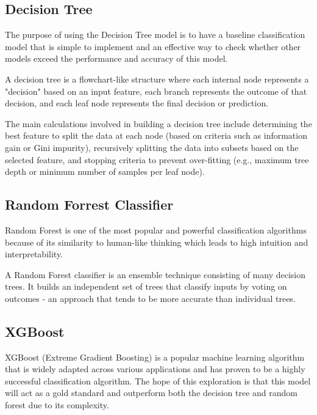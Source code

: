 \documentclass[twoside,twocolumn]{article}
\begin{document}
\subsection{Decision Tree}
The purpose of using the Decision Tree model is to have a baseline classification model that is simple to implement and an effective way to check whether other models exceed the performance and accuracy of this model.

A decision tree is a flowchart-like structure where each internal node represents a "decision" based on an input feature, each branch represents the outcome of that decision, and each leaf node represents the final decision or prediction.

The main calculations involved in building a decision tree include determining the best feature to split the data at each node (based on criteria such as information gain or Gini impurity), recursively splitting the data into subsets based on the selected feature, and stopping criteria to prevent over-fitting (e.g., maximum tree depth or minimum number of samples per leaf node).

\subsection{Random Forrest Classifier}
Random Forest is one of the most popular and powerful classification algorithms because of its similarity to human-like thinking which leads to high intuition and interpretability.

A Random Forest classifier is an ensemble technique consisting of many decision trees. It builds an independent set of trees that classify inputs by voting on outcomes - an approach that tends to be more accurate than individual trees.

\subsection{XGBoost}
XGBoost (Extreme Gradient Boosting) is a popular machine learning algorithm that is widely adapted across various applications and has proven to be a highly successful classification algorithm. The hope of this exploration is that this model will act as a gold standard and outperform both the decision tree and random forest due to its complexity.
\end{document}
